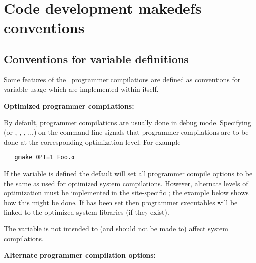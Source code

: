 
\newpage
\section{Code development makedefs conventions}
\label{Code development makedefs conventions}

\subsection*{Conventions for  variable definitions}

Some features of the \aipspp\ programmer compilations are defined as
conventions for variable usage which are implemented within 
itself.

\textbf{Optimized programmer compilations:}

By default, programmer compilations are usually done in debug mode.
Specifying  (or , , , ...) on the
 command line signals that programmer compilations are to be
done at the corresponding optimization level.  For example

\begin{verbatim}
   gmake OPT=1 Foo.o
\end{verbatim}

\noindent
If the  variable is defined the default  will set
all programmer compile options to be the same as used for optimized system
compilations.  However, alternate levels of optimization must be implemented
in the site-specific ; the example below shows how this might
be done.  If  has been set then programmer executables will be
linked to the optimized system libraries (if they exist).

The  variable is not intended to (and should not be made to) affect
system compilations.

\textbf{Alternate programmer compilation options:}

